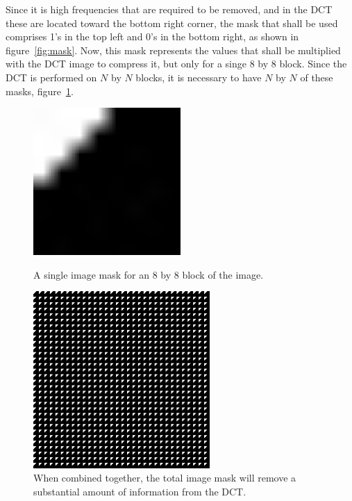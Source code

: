 		Since it is high frequencies that are required to be removed, and in the DCT these are located toward the bottom right corner, the mask that shall be used comprises 1's in the top left and 0's in the bottom right, as shown in figure~\ref{fig:mask}. Now, this mask represents the values that shall be multiplied with the DCT image to compress it, but only for a singe 8 by 8 block. Since the DCT is performed on $N$ by $N$ blocks, it is necessary to have $N$ by $N$ of these masks, figure~\ref{fig:NxN_mask}.
		\begin{figure}[ht]
			\centering
			\begin{minipage}[c]{0.45\linewidth}
				\centering
			 	\includegraphics[width=0.5\textwidth]{mask.jpg}
			 	\caption{A single image mask for an 8 by 8 block of the image.\label{fig:mask}}
			\end{minipage}
			\begin{minipage}[c]{0.45\linewidth}
				\centering
			 	\includegraphics[width=0.6\textwidth]{NxN_mask.jpg}
			 	\caption{When combined together, the total image mask will remove a substantial amount of information from the DCT.\label{fig:NxN_mask}}
			\end{minipage}
		\end{figure}

